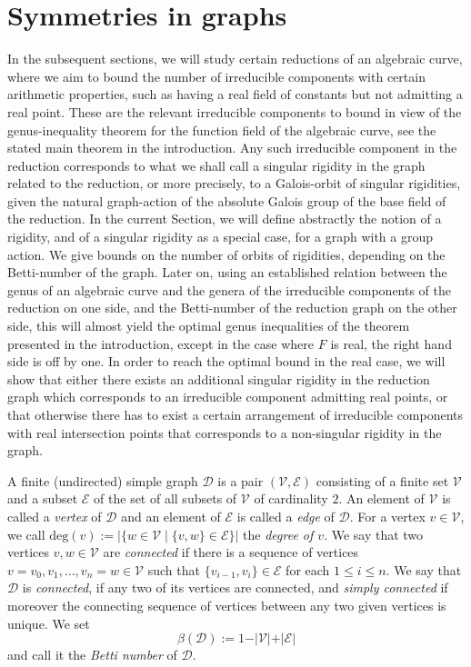 \documentclass[a4paper,12pt,reqno]{amsart}
\newcommand\mc\mathcal
\theoremstyle{definition}
\numberwithin{equation}{thm}
\renewcommand{\leq}{\leqslant}
\begin{document}
\section{Symmetries in graphs}
In the subsequent sections, we will study certain reductions of an algebraic curve, where we aim to bound the number of irreducible components with certain arithmetic properties, such as having a real field of constants but not admitting a real point. These are the relevant irreducible components to bound in view of the genus-inequality theorem for the function field of the algebraic curve, see the stated main theorem in the introduction. Any such irreducible component in the reduction corresponds to what we shall call a singular rigidity in the graph related to the reduction, or more precisely, to a Galois-orbit of singular rigidities, given the natural graph-action of the absolute Galois group of the base field of the reduction. In the current Section, we will define abstractly the notion of a rigidity, and of a singular rigidity as a special case, for a graph with a group action. We give bounds on the number of orbits of rigidities, depending on the Betti-number of the graph. Later on, using an established relation between the genus of an algebraic curve and the genera of the irreducible components of the reduction on one side, and the Betti-number of the reduction graph on the other side, this will almost yield the optimal genus inequalities of the theorem presented in the introduction, except in the case where $F$ is real, the right hand side is off by one. In order to reach the optimal bound in the real case,  we will show that either there exists an additional singular rigidity in the reduction graph which corresponds to an irreducible component admitting real points, or that otherwise there has to exist a certain arrangement of irreducible components with real intersection points that corresponds to a non-singular rigidity in the graph.

\bigskip

A finite (undirected) simple graph $\mathcal{D}$ is a pair $(\mathcal{V}, \mathcal{E})$ consisting of a finite set $\mathcal{V}$ and a subset $\mathcal{E}$ of the set of all subsets of $\mathcal{V}$ of cardinality $2$. An element of $\mathcal{V}$ is called a \textit{vertex} of $\mathcal{D}$ and an element of $\mathcal{E}$ is called a \textit{edge} of $\mathcal{D}$.
For a vertex $v \in \mc{V}$, we call  $\mathrm{deg}(v):= \vert \{w \in \mathcal{V} \mid \{v,w\} \in \mathcal{E}\} \vert$ the \textit{degree of $v$}.
We say that two vertices $v,w \in \mc{V}$ are  \textit{connected} if there is a sequence of vertices $v=v_0, v_1,\ldots, v_n=w \in \mathcal{V}$ such that $\{v_{i-1},v_{i}\} \in \mathcal{E}$ for each $1 \leq i \leq n$.  We say that $\mc{D}$ is \textit{connected}, if any two of its vertices are connected, and \textit{simply connected} if moreover the connecting sequence of vertices between any two given vertices is unique. We set $$\beta(\mc{D}):= 1 -\vert \mc{V} \vert + \vert \mc{E} \vert$$ and call it the \textit{Betti number} of $\mc{D}$.
\end{document}
